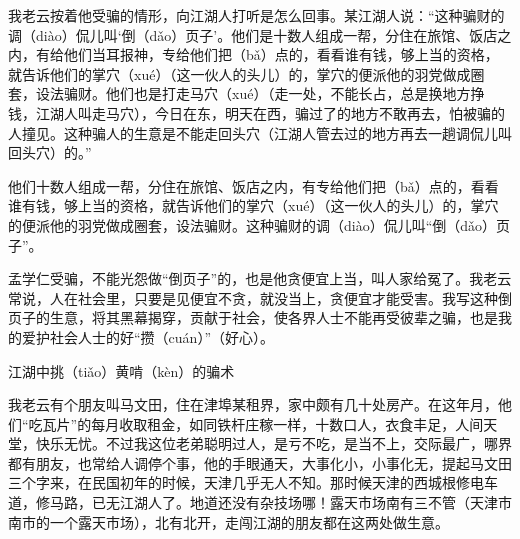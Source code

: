 \documentclass[12pt,UTF8]{ctexbook}
\begin{document}
我老云按着他受骗的情形，向江湖人打听是怎么回事。某江湖人说：“这种骗财的调（diào）侃儿叫‘倒（dǎo）页子’。他们是十数人组成一帮，分住在旅馆、饭店之内，有给他们当耳报神，专给他们把（bǎ）点的，看看谁有钱，够上当的资格，就告诉他们的掌穴（xué）（这一伙人的头儿）的，掌穴的便派他的羽党做成圈套，设法骗财。他们也是打走马穴（xué）（走一处，不能长占，总是换地方挣钱，江湖人叫走马穴），今日在东，明天在西，骗过了的地方不敢再去，怕被骗的人撞见。这种骗人的生意是不能走回头穴（江湖人管去过的地方再去一趟调侃儿叫回头穴）的。”

他们十数人组成一帮，分住在旅馆、饭店之内，有专给他们把（bǎ）点的，看看谁有钱，够上当的资格，就告诉他们的掌穴（xué）（这一伙人的头儿）的，掌穴的便派他的羽党做成圈套，设法骗财。这种骗财的调（diào）侃儿叫“倒（dǎo）页子”。



孟学仁受骗，不能光怨做“倒页子”的，也是他贪便宜上当，叫人家给冤了。我老云常说，人在社会里，只要是见便宜不贪，就没当上，贪便宜才能受害。我写这种倒页子的生意，将其黑幕揭穿，贡献于社会，使各界人士不能再受彼辈之骗，也是我的爱护社会人士的好“攒（cuán）”（好心）。





江湖中挑（tiǎo）黄啃（kèn）的骗术


我老云有个朋友叫马文田，住在津埠某租界，家中颇有几十处房产。在这年月，他们“吃瓦片”的每月收取租金，如同铁杆庄稼一样，十数口人，衣食丰足，人间天堂，快乐无忧。不过我这位老弟聪明过人，是亏不吃，是当不上，交际最广，哪界都有朋友，也常给人调停个事，他的手眼通天，大事化小，小事化无，提起马文田三个字来，在民国初年的时候，天津几乎无人不知。那时候天津的西城根修电车道，修马路，已无江湖人了。地道还没有杂技场哪！露天市场南有三不管（天津市南市的一个露天市场），北有北开，走闯江湖的朋友都在这两处做生意。
\end{document}
